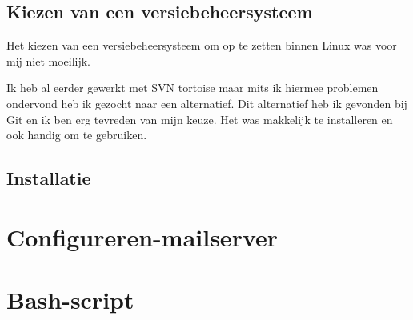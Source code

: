 \documentclass{article}
\begin{document}
\begin{flushleft}
\subsection{Kiezen van een versiebeheersysteem}
Het kiezen van een versiebeheersysteem om op te zetten binnen Linux was voor mij niet moeilijk.\medskip

Ik heb al eerder gewerkt met SVN tortoise maar mits ik hiermee problemen ondervond heb ik gezocht naar een alternatief. Dit alternatief heb ik gevonden bij Git en ik ben erg tevreden van mijn keuze. Het was makkelijk te installeren en ook handig om te gebruiken.
\subsection{Installatie}

\section[Mail-server]{Configureren-mailserver}
\section{Bash-script}
\end{flushleft}
\end{document}
